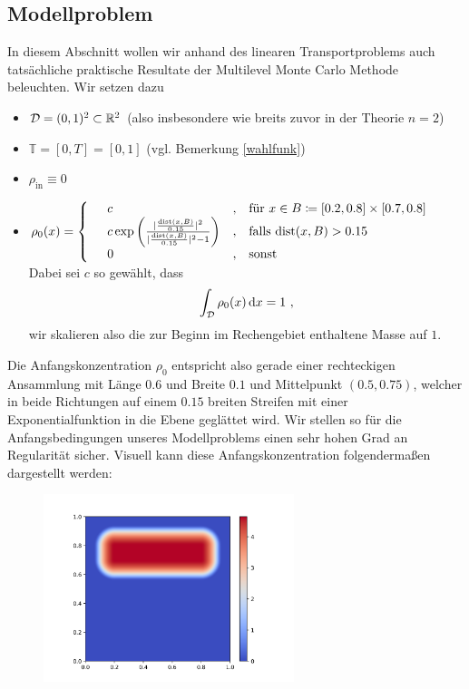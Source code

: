 
\subsection{Modellproblem}

In diesem Abschnitt wollen wir anhand des linearen Transportproblems auch tatsächliche praktische Resultate der Multilevel Monte Carlo Methode beleuchten.
Wir setzen dazu
\begin{itemize}
	\item $ \mathcal{D} = (0,1)^2 \subset \mathbb{R}^2 $ (also insbesondere wie breits zuvor in der Theorie $ n=2 $)
	\item $ \mathbb{T} = [0,T] = [0,1] $ (vgl. Bemerkung \ref{wahlfunk})
	\item $ \rho_{\text{in}} \equiv 0 $
	\item $ \rho_0(x) = 
	\begin{cases*}
		\begin{array}{llll}
			&c & , &\text{für }x \in B \coloneqq [0.2,0.8] \times [0.7 ,0.8]  \\
			&c\exp \left(\frac{\abs{\frac{\text{dist}(x,B)}{0.15}}^2}{\abs{\frac{\text{dist}(x,B)}{0.15}}^2-1}\right) &, &\text{falls } \text{dist}(x,B)>0.15 \\
			&0 &, & \text{sonst}
		\end{array}
	\end{cases*}$ \\
	Dabei sei $ c $ so gewählt, dass 
	\[
		\int_{\mathcal{D}} \rho_0(x) \, \mathrm{d} x = 1 \ ,
	\]
	wir skalieren also die zur Beginn im Rechengebiet enthaltene Masse auf $ 1 $.
\end{itemize} 
Die Anfangskonzentration $ \rho_0 $ entspricht also gerade einer rechteckigen Ansammlung mit Länge $ 0.6$ und Breite $ 0.1$ und Mittelpunkt $ (0.5,0.75) $, welcher in beide Richtungen auf einem $ 0.15$ breiten Streifen mit einer Exponentialfunktion in die Ebene geglättet wird. 
Wir stellen so für die Anfangsbedingungen unseres Modellproblems einen sehr hohen Grad an Regularität sicher. 
Visuell kann diese Anfangskonzentration folgendermaßen dargestellt werden:
\begin{figure}[H]
	\centering
	\includegraphics[width=0.65\textwidth]{plots/anfangsbedingung.png} 
\end{figure}
